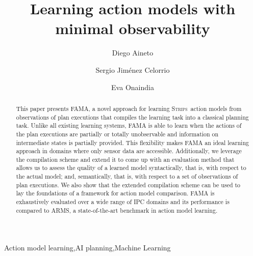 \documentclass[3p,times]{elsarticle}
\newcommand{\strips}{\textsc{Strips}}     %
\newcommand{\ARMS}{{\small {\sffamily ARMS}}\xspace}
\newcommand{\FAMA}{{\small {\sffamily FAMA}}\xspace}
\begin{document}
\begin{frontmatter}



\dochead{}

\title{Learning action models with minimal observability}
\author[label1]{Diego Aineto}
\author[label1]{Sergio Jim\'{e}nez Celorrio}
\author[label1]{Eva Onaindia}
\address[label1]{Department of Computer Systems and Computation, Universitat Polit\`ecnica de Val\`encia. Spain}




\begin{abstract}
  This paper presents \FAMA, a novel approach for learning \strips\ action models from observations of plan executions that compiles the learning task into a classical planning task. Unlike all existing learning systems, \FAMA is able to learn when the actions of the plan executions are partially or totally unobservable and information on intermediate states is partially provided. This flexibility makes \FAMA an ideal learning approach in domains where only sensor data are accessible. Additionally, we leverage the compilation scheme and extend it to come up with an evaluation method that allows us to assess the quality of a learned model syntactically, that is, with respect to the actual model; and, semantically, that is, with respect to a set of observations of plan executions. We also show that the extended compilation scheme can be used to lay the foundations of a framework for action model comparison. \FAMA is exhaustively evaluated over a wide range of IPC domains and its performance is compared to \ARMS, a state-of-the-art benchmark in action model learning.
\end{abstract}

\begin{keyword}
Action model learning\sep AI planning\sep Machine Learning

\end{keyword}

\end{frontmatter}
\end{document}
